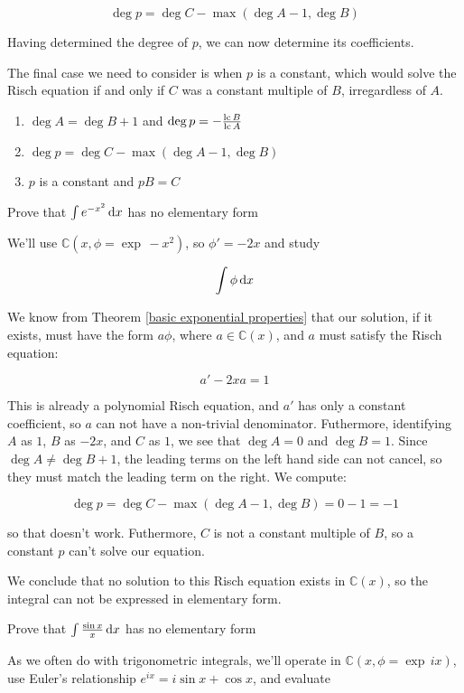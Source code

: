 $$\deg p = \deg C - \max(\deg A - 1, \deg B)$$

Having determined the degree of $p$, we can now determine its
coefficients.

The final case we need to consider is when $p$ is a constant, which
would solve the Risch equation if and only if $C$ was a constant
multiple of $B$, irregardless of $A$.

\begin{enumerate}
\item $\deg A = \deg B + 1$ and $\deg p =-\frac{{\rm lc\,} B}{{\rm lc\,} A} $
\item $\deg p = \deg C - \max(\deg A - 1, \deg B)$
\item $p$ is a constant and $pB = C$
\end{enumerate}

\vfill\eject

\example
\label{exp e^{-x^2}}
Prove that $\int e^{-x^2}\, {\rm d}x$ has no elementary form

We'll use ${\mathbb C}(x, \phi = \exp\, -x^2)$, so $\phi' = -2x$ and
study

$$\int \phi \, {\rm d}x$$

We know from Theorem \ref{basic exponential properties} that our
solution, if it exists, must have the form $a\phi$, where $a \in
{\mathbb C}(x)$, and $a$ must satisfy the Risch equation:

$$a' - 2x a = 1$$

This is already a polynomial Risch equation, and $a'$ has only
a constant coefficient, so $a$ can not have a non-trivial denominator.
Futhermore, identifying $A$ as $1$, $B$ as $-2x$, and $C$ as $1$,
we see that $\deg A = 0$ and $\deg B = 1$.  Since $\deg A \ne \deg B + 1$,
the leading terms on the left hand side can not cancel,
so they must match the leading term on the right.
We compute:

$$\deg p = \deg C - \max(\deg A - 1, \deg B) = 0 - 1 = -1$$

so that doesn't work.  Futhermore, $C$ is not a constant
multiple of $B$, so a constant $p$ can't solve our equation.

We conclude that no solution to this Risch equation exists in ${\mathbb C}(x)$,
so the integral can not be expressed in elementary form.

\endexample


\example Prove that $\int \frac{\sin x}{x} \, {\rm d}x$ has no elementary form

As we often do with trigonometric integrals, we'll operate in
${\mathbb C}(x, \phi = \exp \,ix)$, use Euler's relationship
$e^{ix}=i\sin x + \cos x$, and evaluate

